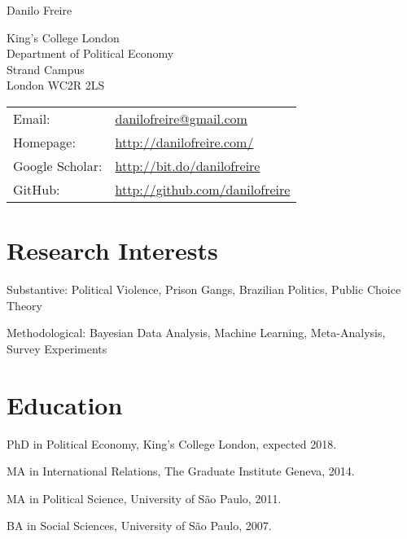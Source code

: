 \documentclass[letterpaper]{article}
\def\name{Danilo Freire}
\renewenvironment{itemize}{
  \begin{list}{}{
    \setlength{\leftmargin}{1.5em}
  }
}{
  \end{list}
}
\begin{document}
{\huge \name}


\vspace{0.25in}

\begin{minipage}{0.45\linewidth}
	King's College London \\
	Department of Political Economy \\
	Strand Campus \\
	London WC2R 2LS
\end{minipage}
\begin{minipage}{0.45\linewidth}
	\begin{tabular}{ll}
		Email:          & \href{mailto:danilofreire@gmail.com}{danilofreire@gmail.com}          \\
		Homepage:       & \href{http://danilofreire.com/}{http://danilofreire.com/}             \\
		Google Scholar: & \href{http://bit.do/danilofreire}{http://bit.do/danilofreire}         \\
		GitHub:         & \href{http://github.com/danilofreire}{http://github.com/danilofreire}
	\end{tabular}
\end{minipage}

\section*{Research Interests}

\begin{itemize}
	\item Substantive: Political Violence, Prison Gangs, Brazilian Politics, Public Choice Theory
	\item Methodological: Bayesian Data Analysis, Machine Learning, Meta-Analysis, Survey Experiments
\end{itemize}

\section*{Education}

\begin{itemize}
	\item PhD in Political Economy, King's College London, expected 2018.
	\item MA in International Relations, The Graduate Institute Geneva, 2014.
	\item MA in Political Science, University of S\~{a}o Paulo, 2011.
	\item BA in Social Sciences, University of S\~{a}o Paulo, 2007.
\end{itemize}
\end{document}
